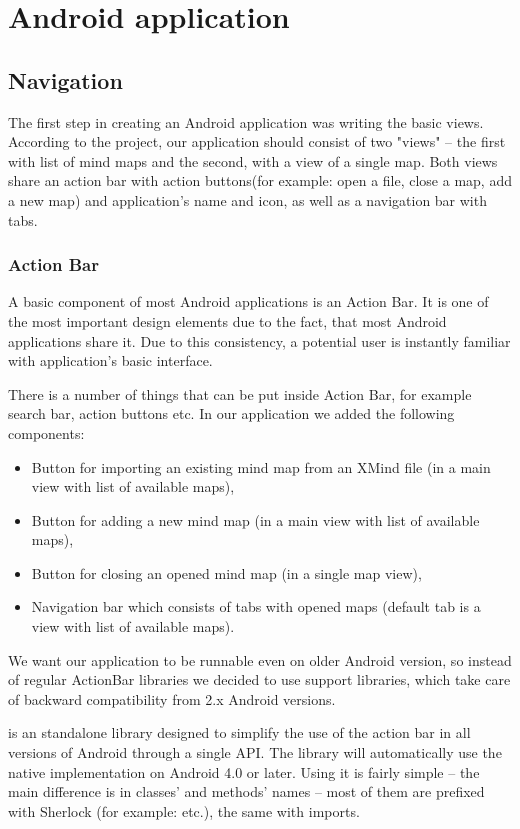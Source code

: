 \section{Android application}
\label{sec:android-app}

\subsection{Navigation}
\label{subsec:drawing}
The first step in creating an Android application was writing the basic views. According to the project, our application should consist of two "views" -- the first with list of mind maps and the second, with a view of a single map. Both views share an action bar with action buttons(for example: open a file, close a map, add a new map) and application's name and icon, as well as a navigation bar with tabs. 

\subsubsection{Action Bar}
\label{subsubsec:action-bar}
A basic component of most Android applications is an Action Bar. It is one of the most important design elements due to the fact, that most Android applications share it. Due to this consistency, a potential user is instantly familiar with application's basic interface. 

There is a number of things that can be put inside Action Bar, for example search bar, action buttons etc. In our application we added the following components:
\begin{itemize}
	\item Button for importing an existing mind map  from an XMind file (in a main view with list of available maps),
	\item Button for adding a new mind map (in a main view with list of available maps),
	\item Button for closing an opened mind map (in a single map view),
	\item Navigation bar which consists of tabs with opened maps (default tab is a view with list of available maps).
\end{itemize}

We want our application to be runnable even on older Android version, so instead of regular ActionBar libraries we decided to use support libraries, which take care of backward compatibility from 2.x Android versions.

 is an standalone library designed to simplify the use of the action bar in all versions of Android through a single API. The library will automatically use the native  implementation on Android 4.0 or later\cite{Wharton:2013:sherlock}. Using it is fairly simple -- the main difference is in  classes' and methods' names -- most of them are prefixed with Sherlock (for example:  etc.), the same with imports. 

